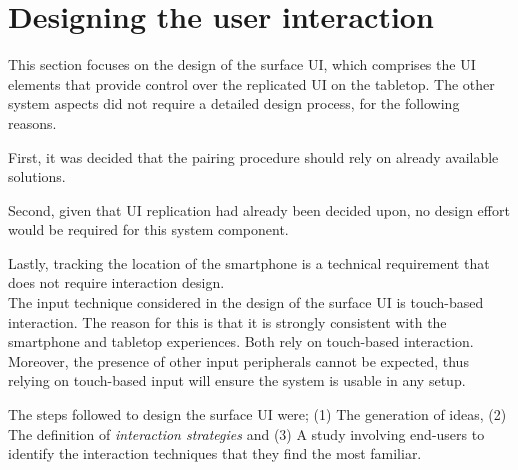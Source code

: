 \section{Designing the user interaction}
\label{sec:interaction}

This section focuses on the design of the surface UI, which comprises the UI elements that provide control over the replicated UI on the tabletop.
The other system aspects did not require a detailed design process, for the following reasons.

First, it was decided that the pairing procedure should rely on already available solutions.

Second, given that UI replication had already been decided upon, no design effort would be required for this system component.

Lastly, tracking the location of the smartphone is a technical requirement that does not require interaction design. %
\\
\linebreak
The input technique considered in the design of the surface UI is touch-based interaction.
The reason for this is that it is strongly consistent with the smartphone and tabletop experiences.
Both rely on touch-based interaction.
Moreover, the presence of other input peripherals cannot be expected, thus relying on touch-based input will ensure the system is usable in any setup.

The steps followed to design the surface UI were; (1) The generation of ideas, (2) The definition of \emph{interaction strategies} and (3) A study involving end-users to identify the interaction techniques that they find the most familiar.


